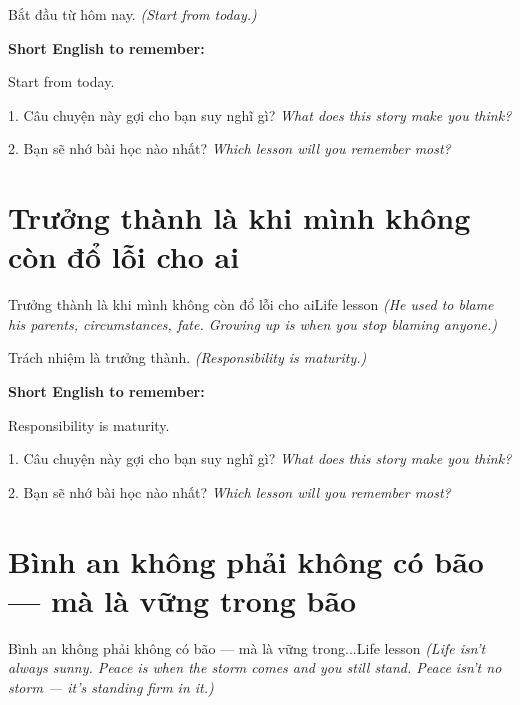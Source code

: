 \begin{baihoc}
Bắt đầu từ hôm nay.
\textit{(Start from today.)}
\end{baihoc}

\begin{ghinhoanh}
\textbf{Short English to remember:}

Start from today.

\end{ghinhoanh}

\begin{tuhocnhanh}
1. Câu chuyện này gợi cho bạn suy nghĩ gì? \textit{What does this story make you think?}

2. Bạn sẽ nhớ bài học nào nhất? \textit{Which lesson will you remember most?}
\end{tuhocnhanh}
\ngancach


\section{Trưởng thành là khi mình không còn đổ lỗi cho ai}
\begin{truyen}{Trưởng thành là khi mình không còn đổ lỗi cho ai}{Life lesson}
\textit{(He used to blame his parents, circumstances, fate. Growing up is when you stop blaming anyone.)}
\end{truyen}

\begin{baihoc}
Trách nhiệm là trưởng thành.
\textit{(Responsibility is maturity.)}
\end{baihoc}

\begin{ghinhoanh}
\textbf{Short English to remember:}

Responsibility is maturity.

\end{ghinhoanh}

\begin{tuhocnhanh}
1. Câu chuyện này gợi cho bạn suy nghĩ gì? \textit{What does this story make you think?}

2. Bạn sẽ nhớ bài học nào nhất? \textit{Which lesson will you remember most?}
\end{tuhocnhanh}
\ngancach


\section{Bình an không phải không có bão — mà là vững trong bão}
\begin{truyen}{Bình an không phải không có bão — mà là vững trong...}{Life lesson}
\textit{(Life isn't always sunny. Peace is when the storm comes and you still stand. Peace isn't no storm — it's standing firm in it.)}
\end{truyen}

